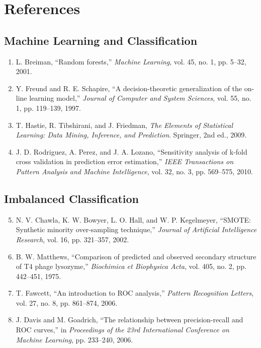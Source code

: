 \chapter*{References}

\section*{Machine Learning and Classification}

\begin{enumerate}
  \item L. Breiman, ``Random forests,'' \textit{Machine Learning}, vol. 45, no. 1, pp. 5--32, 2001.
  
  \item Y. Freund and R. E. Schapire, ``A decision-theoretic generalization of the on-line learning model,'' \textit{Journal of Computer and System Sciences}, vol. 55, no. 1, pp. 119--139, 1997.
  
  \item T. Hastie, R. Tibshirani, and J. Friedman, \textit{The Elements of Statistical Learning: Data Mining, Inference, and Prediction}. Springer, 2nd ed., 2009.
  
  \item J. D. Rodriguez, A. Perez, and J. A. Lozano, ``Sensitivity analysis of k-fold cross validation in prediction error estimation,'' \textit{IEEE Transactions on Pattern Analysis and Machine Intelligence}, vol. 32, no. 3, pp. 569--575, 2010.
\end{enumerate}

\section*{Imbalanced Classification}

\begin{enumerate}
  \setcounter{enumi}{4}
  \item N. V. Chawla, K. W. Bowyer, L. O. Hall, and W. P. Kegelmeyer, ``SMOTE: Synthetic minority over-sampling technique,'' \textit{Journal of Artificial Intelligence Research}, vol. 16, pp. 321--357, 2002.
  
  \item B. W. Matthews, ``Comparison of predicted and observed secondary structure of T4 phage lysozyme,'' \textit{Biochimica et Biophysica Acta}, vol. 405, no. 2, pp. 442--451, 1975.
  
  \item T. Fawcett, ``An introduction to ROC analysis,'' \textit{Pattern Recognition Letters}, vol. 27, no. 8, pp. 861--874, 2006.
  
  \item J. Davis and M. Goadrich, ``The relationship between precision-recall and ROC curves,'' in \textit{Proceedings of the 23rd International Conference on Machine Learning}, pp. 233--240, 2006.
\end{enumerate}


